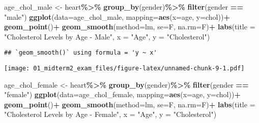 \documentclass[
]{article}
\newenvironment{Shaded}{\begin{snugshade}}{\end{snugshade}}
\newcommand{\AttributeTok}[1]{\textcolor[rgb]{0.13,0.29,0.53}{#1}}
\newcommand{\FunctionTok}[1]{\textcolor[rgb]{0.13,0.29,0.53}{\textbf{#1}}}
\newcommand{\NormalTok}[1]{#1}
\newcommand{\OtherTok}[1]{\textcolor[rgb]{0.56,0.35,0.01}{#1}}
\newcommand{\SpecialCharTok}[1]{\textcolor[rgb]{0.81,0.36,0.00}{\textbf{#1}}}
\newcommand{\StringTok}[1]{\textcolor[rgb]{0.31,0.60,0.02}{#1}}
\begin{document}
\begin{Shaded}
\begin{Highlighting}[]
\NormalTok{age\_chol\_male }\OtherTok{\textless{}{-}}\NormalTok{ heart}\SpecialCharTok{\%\textgreater{}\%}
  \FunctionTok{group\_by}\NormalTok{(gender)}\SpecialCharTok{\%\textgreater{}\%}
  \FunctionTok{filter}\NormalTok{(gender }\SpecialCharTok{==} \StringTok{"male"}\NormalTok{)}
\FunctionTok{ggplot}\NormalTok{(}\AttributeTok{data=}\NormalTok{age\_chol\_male, }\AttributeTok{mapping=}\FunctionTok{aes}\NormalTok{(}\AttributeTok{x=}\NormalTok{age, }\AttributeTok{y=}\NormalTok{chol))}\SpecialCharTok{+}
  \FunctionTok{geom\_point}\NormalTok{()}\SpecialCharTok{+}
  \FunctionTok{geom\_smooth}\NormalTok{(}\AttributeTok{method=}\NormalTok{lm, }\AttributeTok{se=}\NormalTok{F, }\AttributeTok{na.rm=}\NormalTok{F)}\SpecialCharTok{+}
  \FunctionTok{labs}\NormalTok{(}\AttributeTok{title =} \StringTok{"Cholesterol Levels by Age {-} Male"}\NormalTok{, }\AttributeTok{x =} \StringTok{"Age"}\NormalTok{, }\AttributeTok{y =} \StringTok{"Cholesterol"}\NormalTok{)}
\end{Highlighting}
\end{Shaded}

\begin{verbatim}
## `geom_smooth()` using formula = 'y ~ x'
\end{verbatim}

\texttt{[image: 01\_midterm2\_exam\_files/figure-latex/unnamed-chunk-9-1.pdf]}

\begin{Shaded}
\begin{Highlighting}[]
\NormalTok{age\_chol\_female }\OtherTok{\textless{}{-}}\NormalTok{ heart}\SpecialCharTok{\%\textgreater{}\%}
  \FunctionTok{group\_by}\NormalTok{(gender)}\SpecialCharTok{\%\textgreater{}\%}
  \FunctionTok{filter}\NormalTok{(gender }\SpecialCharTok{==} \StringTok{"female"}\NormalTok{)}
\FunctionTok{ggplot}\NormalTok{(}\AttributeTok{data=}\NormalTok{age\_chol\_female, }\AttributeTok{mapping=}\FunctionTok{aes}\NormalTok{(}\AttributeTok{x=}\NormalTok{age, }\AttributeTok{y=}\NormalTok{chol))}\SpecialCharTok{+}
  \FunctionTok{geom\_point}\NormalTok{()}\SpecialCharTok{+}
  \FunctionTok{geom\_smooth}\NormalTok{(}\AttributeTok{method=}\NormalTok{lm, }\AttributeTok{se=}\NormalTok{F, }\AttributeTok{na.rm=}\NormalTok{F)}\SpecialCharTok{+}
  \FunctionTok{labs}\NormalTok{(}\AttributeTok{title =} \StringTok{"Cholesterol Levels by Age {-} Female"}\NormalTok{, }\AttributeTok{x =} \StringTok{"Age"}\NormalTok{, }\AttributeTok{y =} \StringTok{"Cholesterol"}\NormalTok{)}
\end{Highlighting}
\end{Shaded}
\end{document}
